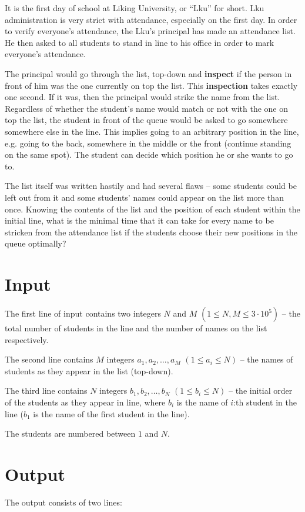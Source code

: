 It is the first day of school at Liking University, or ``Lku'' for short.
Lku administration is very strict with attendance, especially on the first day.
In order to verify everyone's attendance, the Lku's principal has made an attendance list.
He then asked to all students to stand in line to his office in order to mark everyone's attendance.

The principal would go through the list, top-down and \textbf{inspect} if the person in front of him was the one currently on top the list.
This \textbf{inspection} takes exactly one second.
If it was, then the principal would strike the name from the list.
Regardless of whether the student's name would match or not with the one on top the list, the student in front of the queue would be asked to go somewhere somewhere else in the line.
This implies going to an arbitrary position in the line, e.g. going to the back, somewhere in the middle or the front (continue standing on the same spot).
The student can decide which position he or she wants to go to.

The list itself was written hastily and had several flaws -- some students could be left out from it and some students' names could appear on the list more than once.
Knowing the contents of the list and the position of each student within the initial line, what is the minimal time that it can take for every name to be stricken from the attendance list if the students choose their new positions in the queue optimally?

\section*{Input}
The first line of input contains two integers $N$ and $M$ $(1 \leq N, M \leq 3 \cdot 10^5)$ -- the total number of students in the line and the number of names on the list respectively.

The second line contains $M$ integers $a_1, a_2, \dots , a_M$ $(1 \leq a_i \leq N)$ -- the names of students as they appear in the list (top-down).

The third line contains $N$ integers $b_1, b_2, \dots , b_N$ $(1 \leq b_i \leq N)$ -- the initial order of the students as they appear in line, where $b_i$ is the name of $i$:th student in the line ($b_1$ is the name of the first student in the line).

The students are numbered between $1$ and $N$.

\section*{Output}
The output consists of two lines:

